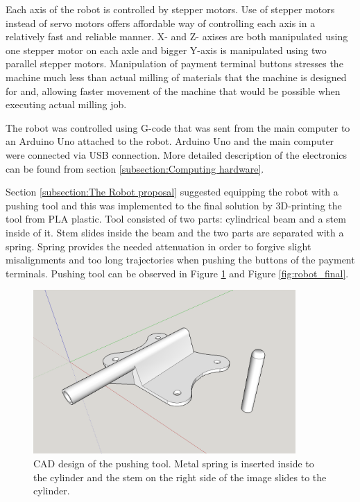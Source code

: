 Each axis of the robot is controlled by stepper motors. Use of stepper motors instead of servo motors offers affordable way of controlling each axis in a relatively fast and reliable manner. X- and Z- axises are both manipulated using one stepper motor on each axle and bigger Y-axis is manipulated using two parallel stepper motors. Manipulation of payment terminal buttons stresses the machine much less than actual milling of materials that the machine is designed for and, allowing faster movement of the machine that would be possible when executing actual milling job.

The robot was controlled using G-code that was sent from the main computer to an Arduino Uno attached to the robot. Arduino Uno and the main computer were connected via USB connection. More detailed description of the electronics can be found from section \ref{subsection:Computing hardware}.

Section \ref{subsection:The Robot proposal} suggested equipping the robot with a pushing tool and this was implemented to the final solution by 3D-printing the tool from PLA plastic. Tool consisted of two parts: cylindrical beam and a stem inside of it. Stem slides inside the beam and the two parts are separated with a spring. Spring provides the needed attenuation in order to forgive slight misalignments and too long trajectories when pushing the buttons of the payment terminals. Pushing tool can be observed in Figure \ref{fig:pushing_tool} and Figure \ref{fig:robot_final}.

\begin{figure}[ht]
  \begin{center}
    \includegraphics[width=10cm]{images/pushing_tool.png}
    \caption{CAD design of the pushing tool. Metal spring is inserted inside to the cylinder and the stem on the right side of the image slides to the cylinder.}
    \label{fig:pushing_tool}
  \end{center}
\end{figure}
\FloatBarrier

